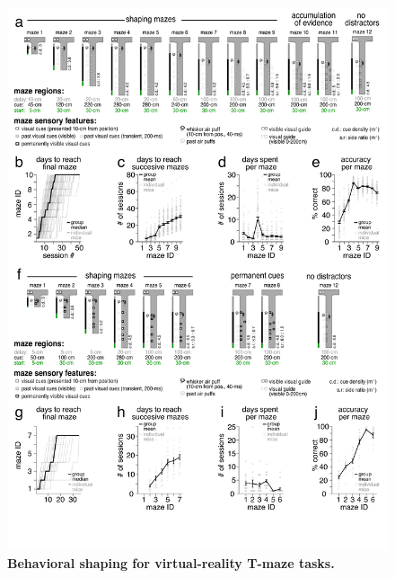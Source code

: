 \begin{figure}[t!]
\vspace{-0.2cm}
  \begin{center}
    \includegraphics[width=0.90\linewidth]{ch7-appendix1/appendix1-figures/Supplementary_Fig5.pdf}
    \caption[Behavioral shaping for virtual-reality T-maze tasks]{\textbf{Behavioral shaping for virtual-reality T-maze tasks.} }
    \label{fig:ap1:supp5}
  \end{center}
\end{figure}
